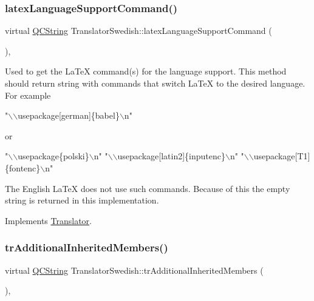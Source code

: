 \subsubsection{\texorpdfstring{latexLanguageSupportCommand()}{latexLanguageSupportCommand()}}
{\footnotesize\ttfamily virtual \mbox{\hyperlink{class_q_c_string}{Q\+C\+String}} Translator\+Swedish\+::latex\+Language\+Support\+Command (\begin{DoxyParamCaption}{ }\end{DoxyParamCaption})\hspace{0.3cm}{\ttfamily [inline]}, {\ttfamily [virtual]}}

Used to get the La\+TeX command(s) for the language support. This method should return string with commands that switch La\+TeX to the desired language. For example 
\begin{DoxyPre}"\(\backslash\)\(\backslash\)usepackage[german]\{babel\}\(\backslash\)n"
 \end{DoxyPre}
 or 
\begin{DoxyPre}"\(\backslash\)\(\backslash\)usepackage\{polski\}\(\backslash\)n"
 "\(\backslash\)\(\backslash\)usepackage[latin2]\{inputenc\}\(\backslash\)n"
 "\(\backslash\)\(\backslash\)usepackage[T1]\{fontenc\}\(\backslash\)n"
 \end{DoxyPre}


The English La\+TeX does not use such commands. Because of this the empty string is returned in this implementation. 

Implements \mbox{\hyperlink{class_translator}{Translator}}.

\mbox{\label{class_translator_swedish_a5a4d185a391668d226742c7db881f93e}} 
\subsubsection{\texorpdfstring{trAdditionalInheritedMembers()}{trAdditionalInheritedMembers()}}
{\footnotesize\ttfamily virtual \mbox{\hyperlink{class_q_c_string}{Q\+C\+String}} Translator\+Swedish\+::tr\+Additional\+Inherited\+Members (\begin{DoxyParamCaption}{ }\end{DoxyParamCaption})\hspace{0.3cm}{\ttfamily [inline]}, {\ttfamily [virtual]}}

